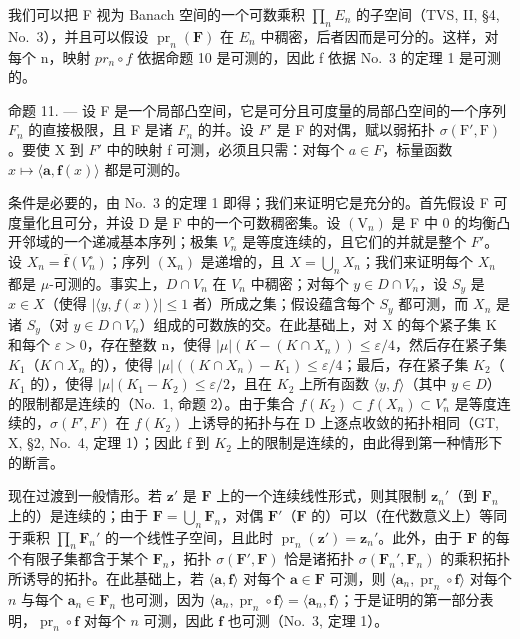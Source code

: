 我们可以把 F 视为 Banach 空间的一个可数乘积 \(\prod_{n}E_{n}\) 的子空间（TVS, II, §4, No.~3），并且可以假设 \(\operatorname{pr}_{n}(\mathbf{F})\) 在 \(E_{n}\) 中稠密，后者因而是可分的。这样，对每个 n，映射 \(pr_{n}\circ f\) 依据命题 10 是可测的，因此 f 依据 No.~3 的定理 1 是可测的。

命题 11. --- 设 F 是一个局部凸空间，它是可分且可度量的局部凸空间的一个序列 \(F_{n}\) 的直接极限，且 F 是诸 \(F_{n}\) 的并。设 \(F'\) 是 F 的对偶，赋以弱拓扑 \(\sigma(\mathrm{F}',\mathrm{F})\)。要使 X 到 \(F'\) 中的映射 f 可测，必须且只需：对每个 \(a \in F\)，标量函数 \(x \mapsto \langle \mathbf{a}, \mathbf{f}(x) \rangle\) 都是可测的。

条件是必要的，由 No.~3 的定理 1 即得；我们来证明它是充分的。首先假设 F 可度量化且可分，并设 D 是 F 中的一个可数稠密集。设 \((\mathrm{V}_{n})\) 是 F 中 0 的均衡凸开邻域的一个递减基本序列；极集 \(V_{n}^{\circ}\) 是等度连续的，且它们的并就是整个 \(F'\)。设 \(X_{n} = \overline{\mathbf{f}}(V_{n}^{\circ})\)；序列 \((\mathrm{X}_{n})\) 是递增的，且 \(X = \bigcup_{n} X_{n}\)；我们来证明每个 \(X_{n}\) 都是 \(\mu\)-可测的。事实上，\(D \cap V_{n}\) 在 \(V_{n}\) 中稠密；对每个 \(y \in D \cap V_{n}\)，设 \(S_{y}\) 是 \(x \in X\)（使得 \(|\langle y, f(x) \rangle| \leqslant 1\) 者）所成之集；假设蕴含每个 \(S_{y}\) 都可测，而 \(X_{n}\) 是诸 \(S_{y}\)（对 \(y \in D \cap V_{n}\)）组成的可数族的交。在此基础上，对 X 的每个紧子集 K 和每个 \(\varepsilon > 0\)，存在整数 n，使得 \(|\mu| (K - (K \cap X_{n})) \leqslant \varepsilon/4\)，然后存在紧子集 \(K_{1}\)（\(K \cap X_{n}\) 的），使得 \(|\mu| ((K \cap X_{n}) - K_{1}) \leqslant \varepsilon/4\)；最后，存在紧子集 \(K_{2}\)（\(K_{1}\) 的），使得 \(|\mu| (K_{1} - K_{2}) \leqslant \varepsilon/2\)，且在 \(K_{2}\) 上所有函数 \(\langle y, f \rangle\)（其中 \(y \in D\)）的限制都是连续的（No.~1, 命题 2）。由于集合 \(f(K_{2}) \subset f(X_{n}) \subset V_{n}^{\circ}\) 是等度连续的，\(\sigma(F', F)\) 在 \(f(K_{2})\) 上诱导的拓扑与在 D 上逐点收敛的拓扑相同（GT, X, §2, No.~4, 定理 1）；因此 f 到 \(K_{2}\) 上的限制是连续的，由此得到第一种情形下的断言。

现在过渡到一般情形。若 \(\mathbf{z}'\) 是 \(\mathbf{F}\) 上的一个连续线性形式，则其限制 \(\mathbf{z}_n'\)（到 \(\mathbf{F}_n\) 上的）是连续的；由于 \(\mathbf{F} = \bigcup_{n} \mathbf{F}_n\)，对偶 \(\mathbf{F}'\)（\(\mathbf{F}\) 的）可以（在代数意义上）等同于乘积 \(\prod_{n} \mathbf{F}_n'\) 的一个线性子空间，且此时 \(\operatorname{pr}_n(\mathbf{z}') = \mathbf{z}_n'\)。此外，由于 \(\mathbf{F}\) 的每个有限子集都含于某个 \(\mathbf{F}_n\)，拓扑 \(\sigma(\mathbf{F}', \mathbf{F})\) 恰是诸拓扑 \(\sigma(\mathbf{F}_n', \mathbf{F}_n)\) 的乘积拓扑所诱导的拓扑。在此基础上，若 \(\langle \mathbf{a}, \mathbf{f} \rangle\) 对每个 \(\mathbf{a} \in \mathbf{F}\) 可测，则 \(\langle \mathbf{a}_n, \operatorname{pr}_n \circ \mathbf{f} \rangle\) 对每个 \(n\) 与每个 \(\mathbf{a}_n \in \mathbf{F}_n\) 也可测，因为 \(\langle \mathbf{a}_n, \operatorname{pr}_n \circ \mathbf{f} \rangle = \langle \mathbf{a}_n, \mathbf{f} \rangle\)；于是证明的第一部分表明，\(\operatorname{pr}_n \circ \mathbf{f}\) 对每个 \(n\) 可测，因此 \(\mathbf{f}\) 也可测（No.~3, 定理 1）。

